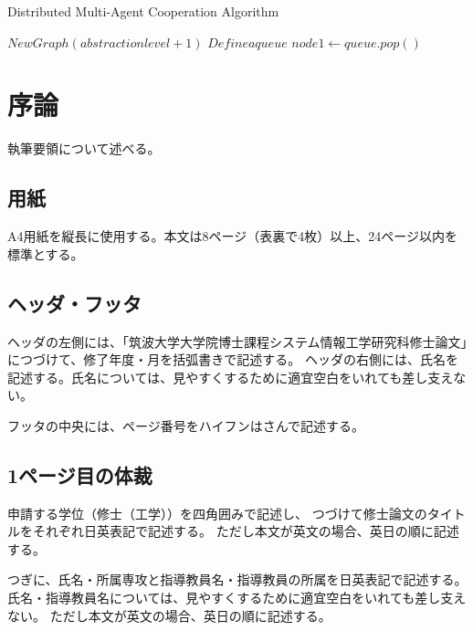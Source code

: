 \documentclass[11pt,twocolumn]{jarticle} %
\begin{document}
\begin{algorithm*}
\caption{Distributed Multi-Agent Cooperation Algorithm}
\begin{algorithmic}
\State {}
\State $New Graph (abstraction level+1)$
\State $Define a queue$
\EndFor
{}
    \State $node1 \gets queue.pop()$
    \EndIf
\EndWhile
{}
\end{algorithmic}
\end{algorithm*}

\section{序論}
執筆要領について述べる。

\subsection{用紙}
A4用紙を縦長に使用する。本文は8ページ（表裏で4枚）以上、24ページ以内を標準とする。

\subsection{ヘッダ・フッタ}
ヘッダの左側には、「筑波大学大学院博士課程システム情報工学研究科修士論文」につづけて、修了年度・月を括弧書きで記述する。
ヘッダの右側には、氏名を記述する。氏名については、見やすくするために適宜空白をいれても差し支えない。

フッタの中央には、ページ番号をハイフンはさんで記述する。

\subsection{1ページ目の体裁}
申請する学位（修士（工学））を四角囲みで記述し、
つづけて修士論文のタイトルをそれぞれ日英表記で記述する。
ただし本文が英文の場合、英日の順に記述する。

つぎに、氏名・所属専攻と指導教員名・指導教員の所属を日英表記で記述する。
氏名・指導教員名については、見やすくするために適宜空白をいれても差し支えない。
ただし本文が英文の場合、英日の順に記述する。
\end{document}
